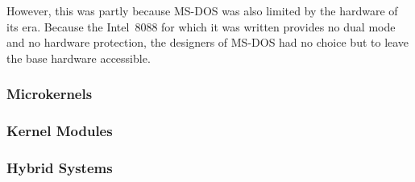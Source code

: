 However, this was partly because MS-DOS was also limited by the hardware of its era.
Because the Intel~8088 for which it was written provides no dual mode and no hardware protection, the designers of MS-DOS had no choice but to leave the base hardware accessible.

\subsubsection{Microkernels}\label{subsubsec:Microkernels}
\subsubsection{Kernel Modules}\label{subsubsec:Kernel_Modules}
\subsubsection{Hybrid Systems}\label{subsubsec:Hybrid_Systems}

